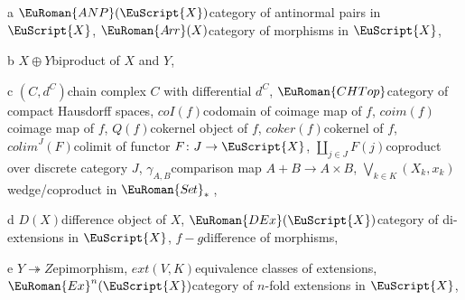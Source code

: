 \documentclass [12pt,oneside]{book}%
\theoremstyle{captionstyle}  %
\newcommand{\IndSep}{\qquad}
\newcommand{\from}{\colon}				%
\newcommand{\Epi}{\twoheadrightarrow}			%
\newcommand{\SetsBsd}{\EuRoman{S{\kern-0.12ex}e{\hskip-0.14ex}t}_{\ast}\,}	%
\newcommand{\CHTops}{\EuRoman{CHTop}}						 %
\newcommand{\Ctgry}[1]{\EuScript{#1}}					%
\newcommand{\ArrowCat}[1]{\EuRoman{A{\kern-0.15ex}r{\hskip-0.1ex}r}(#1)}         %
\newcommand{\ANPCat}[1]{\EuRoman{ANP}(\EuScript{#1})}							%
\newcommand{\DExCat}[1]{\EuRoman{DEx}(\EuScript{#1})}							%
\newcommand{\HExCat}[2]{\EuRoman{Ex}^{#1}(\EuScript{#2})} %
\newcommand{\Prdct}[2]{#1 \times #2}	 	%
\newcommand{\FamCoPrdct}[2]{\coprod_{#1}#2}	%
\newcommand{\BiPrdct}[2]{#1\oplus #2}
\newcommand{\SumProdComp}[2]{\gamma_{#1,#2}}			%
\newcommand{\CoLimOfOver}[2]{\textit{colim}^{#2}\left(#1\right)}		%
\newcommand{\CoKer}[1]{\textit{Q}(#1)}               %
\newcommand{\CoKerMap}[1]{\textit{coker}(#1)}						        %
\newcommand{\CoImg}[1]{\textit{coI}(#1)}	                %
\newcommand{\CoImgMap}[1]{\textit{coim}(#1)}	      %
\newcommand{\ExtMini}[2]{\textit{ext}\left( #1,#2 \right)}
\begin{document}
\renewcommand{\twocolumn}[1][]{#1}
\begin{theindex}

    \item a
    \subitem $\ANPCat {X}$\IndSep category of antinormal pairs in $\Ctgry {X}$,
    \subitem $\ArrowCat {X}$\IndSep category of morphisms in $\Ctgry {X}$,

    \indexspace

    \item b
    \subitem $\BiPrdct {X}{Y}$\IndSep biproduct of $X$ and $Y$,

    \indexspace

    \item c
    \subitem $(C,d^C)$\IndSep chain complex $C$ with differential $d^C$,
    \subitem $\CHTops $\IndSep category of compact Hausdorff spaces,
    \subitem $\CoImg {f}$\IndSep codomain of coimage map of $f$,
    \subitem $\CoImgMap {f}$\IndSep coimage map of $f$, 
    \subitem $\CoKer {f}$\IndSep cokernel object of $f$, 
    \subitem $\CoKerMap {f}$\IndSep cokernel of $f$, 
    \subitem $\CoLimOfOver {F}{J}$\IndSep colimit of functor $F\from J\to \EuScript {X}$,
    \subitem $\FamCoPrdct {j\in J}{F(j)}$\IndSep coproduct over discrete category $J$,
    \subitem $\SumProdComp {A}{B}$\IndSep comparison map $A+B\longrightarrow \Prdct {A}{B}$,
    \subitem $\bigvee _{k\in K} (X_k,x_k)$\IndSep wedge/coproduct in $\SetsBsd $,

    \indexspace

    \item d
    \subitem $D(X)$\IndSep difference object of $X$, 
    \subitem $\DExCat {X}$\IndSep category of di-extensions in $\Ctgry {X}$,
    \subitem $f-g$\IndSep difference of morphisms, 

    \indexspace

    \item e
    \subitem $Y\Epi Z$\IndSep epimorphism, 
    \subitem $\ExtMini {V}{K}$\IndSep equivalence classes of extensions,
    \subitem $\HExCat {n}{X}$\IndSep category of $n$-fold extensions in $\Ctgry {X}$,


\end{theindex}
\end{document}
